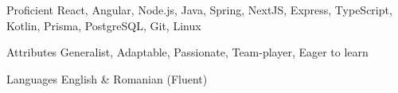 
\begin{cvskills}

  \cvskill
  {Proficient}
  {React, Angular, Node.js, Java, Spring, NextJS, Express, TypeScript, Kotlin, Prisma, PostgreSQL, Git, Linux}

  \cvskill
  {Attributes}
  {Generalist, Adaptable, Passionate, Team-player, Eager to learn}

  \cvskill
  {Languages}
  {English \& Romanian (Fluent)}

\end{cvskills}